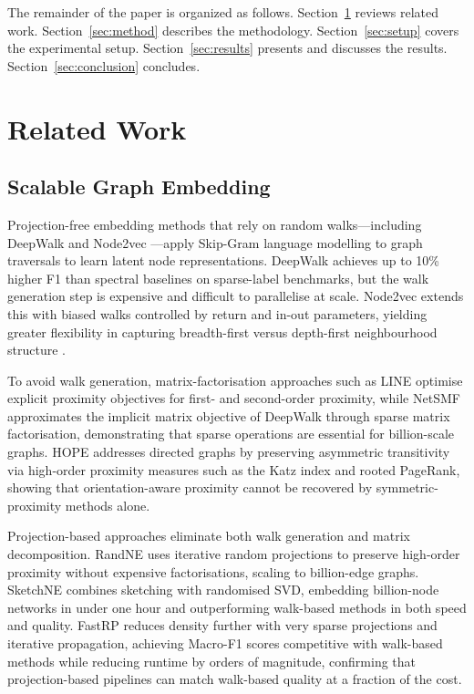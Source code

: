 \documentclass[conference]{IEEEtran}
\begin{document}
The remainder of the paper is organized as follows. Section~\ref{sec:related}
reviews related work. Section~\ref{sec:method} describes the methodology.
Section~\ref{sec:setup} covers the experimental setup. Section~\ref{sec:results}
presents and discusses the results. Section~\ref{sec:conclusion} concludes.

\section{Related Work}
\label{sec:related}

\subsection{Scalable Graph Embedding}

Projection-free embedding methods that rely on random walks---including
DeepWalk \cite{perozzi2014} and Node2vec \cite{grover2016node2vec}---apply
Skip-Gram language modelling to graph traversals to learn latent node
representations. DeepWalk achieves up to 10\% higher F1 than spectral
baselines on sparse-label benchmarks, but the walk generation step is
expensive and difficult to parallelise at scale. Node2vec extends this with
biased walks controlled by return and in-out parameters, yielding greater
flexibility in capturing breadth-first versus depth-first neighbourhood
structure \cite{grover2016node2vec}.

To avoid walk generation, matrix-factorisation approaches such as
LINE \cite{tang2015line} optimise explicit proximity objectives for first-
and second-order proximity, while NetSMF \cite{qiu2019netsmf} approximates
the implicit matrix objective of DeepWalk through sparse matrix factorisation,
demonstrating that sparse operations are essential for billion-scale graphs.
HOPE \cite{ou2016atp} addresses directed graphs by preserving asymmetric
transitivity via high-order proximity measures such as the Katz index and
rooted PageRank, showing that orientation-aware proximity cannot be
recovered by symmetric-proximity methods alone.

Projection-based approaches eliminate both walk generation and matrix
decomposition. RandNE \cite{zhang2018randne} uses iterative random
projections to preserve high-order proximity without expensive
factorisations, scaling to billion-edge graphs. SketchNE
\cite{xie2023sketchne} combines sketching with randomised SVD, embedding
billion-node networks in under one hour and outperforming walk-based methods
in both speed and quality. FastRP \cite{chen2019fast} reduces density
further with very sparse projections and iterative propagation, achieving
Macro-F1 scores competitive with walk-based methods while reducing runtime
by orders of magnitude, confirming that projection-based pipelines can
match walk-based quality at a fraction of the cost.
\end{document}
